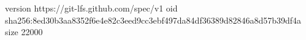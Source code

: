 version https://git-lfs.github.com/spec/v1
oid sha256:8ed30b3aa8352f6e4e82c3eed9cc3ebf497da84df36389d82846a8d57b39df4a
size 22000
